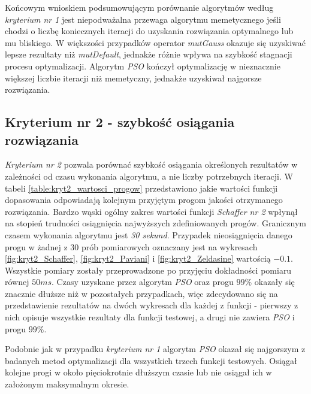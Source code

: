 \FloatBarrier

\par
Końcowym wnioskiem podsumowującym porównanie algorytmów według \emph{kryterium nr 1} jest niepodważalna przewaga algorytmu memetycznego jeśli chodzi o liczbę koniecznych iteracji do uzyskania rozwiązania optymalnego lub mu bliskiego. W większości przypadków operator \emph{mutGauss} okazuje się uzyskiwać lepsze rezultaty niż \emph{mutDefault}, jednakże różnie wpływa na szybkość stagnacji procesu optymalizacji. Algorytm \emph{PSO} kończył optymalizację w nieznacznie większej liczbie iteracji niż memetyczny, jednakże uzyskiwał najgorsze rozwiązania.


\subsection{Kryterium nr 2 - szybkość osiągania rozwiązania}
%

\par
\emph{Kryterium nr 2} pozwala porównać szybkość osiągania określonych rezultatów w zależności od czasu wykonania algorytmu, a nie liczby potrzebnych iteracji. W tabeli \ref{table:kryt2_wartosci_progow} przedstawiono jakie wartości funkcji dopasowania odpowiadają kolejnym przyjętym progom jakości otrzymanego rozwiązania. Bardzo wąski ogólny zakres wartości funkcji \emph{Schaffer nr 2} wpłynął na stopień trudności osiągnięcia najwyższych zdefiniowanych progów. Granicznym czasem wykonania algorytmu jest \emph{30 sekund}. Przypadek nieosiągnięcia danego progu w żadnej z 30 prób pomiarowych oznaczany jest na wykresach \ref{fig:kryt2_Schaffer}, \ref{fig:kryt2_Paviani} i \ref{fig:kryt2_Zeldasine} wartością $-0.1$. Wszystkie pomiary zostały przeprowadzone po przyjęciu dokładności pomiaru równej $50 ms$. Czasy uzyskane przez algorytm \emph{PSO} oraz progu $99\%$ okazały się znacznie dłuższe niż w pozostałych przypadkach, więc zdecydowano się na przedstawienie rezultatów na dwóch wykresach dla każdej z funkcji - pierwszy z nich opisuje wszystkie rezultaty dla funkcji testowej, a drugi nie zawiera \emph{PSO} i progu $99\%$.
\par
Podobnie jak w przypadku \emph{kryterium nr 1} algorytm \emph{PSO} okazał się najgorszym z badanych metod optymalizacji dla wszystkich trzech funkcji testowych. Osiągał kolejne progi w około pięciokrotnie dłuższym czasie lub nie osiągał ich w założonym maksymalnym okresie. 


